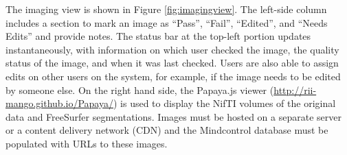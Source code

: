 The imaging view is shown in Figure \ref{fig:imagingview}. The left-side column includes a section to mark an image as ``Pass'', ``Fail'', ``Edited'', and ``Needs Edits'' and provide notes. The status bar at the top-left portion updates instantaneously, with information on which user checked the image, the quality status of the image, and when it was last checked. Users are also able to assign edits on other users on the system, for example, if the image needs to be edited by someone else. On the right hand side, the Papaya.js viewer (\href{http://rii-mango.github.io/Papaya/}{http://rii-mango.github.io/Papaya/}) is used to display the NifTI volumes of the original data and FreeSurfer segmentations. Images must be hosted on a separate server or a content delivery network (CDN) and the Mindcontrol database must be populated with URLs to these images.
